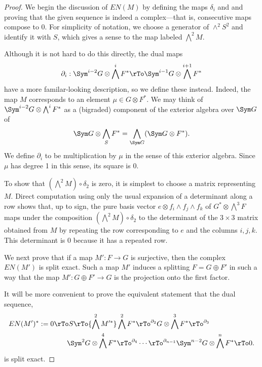 \begin{proof} We begin the discussion of $EN(M)$ by defining the maps $\delta_i$ and and proving that the given sequence is indeed a complex---that is, consecutive maps compose to 0. For simplicity of notation, we choose a generator of $\wedge^2 S^2$
 and identify it with $S$, which gives a sense to the map labeled $\bigwedge^2M$.
 
  Although it is not hard to do this directly, the dual maps
 $$
 \partial_i: \Sym^{i-2} G \otimes \bigwedge^i F^* \rTo \Sym^{i-1} G \otimes \bigwedge^{i+1} F^*
 $$
 have a more familar-looking description, so we define these instead. Indeed, the map $M$ corresponds to an
 element $\mu\in G\otimes F^*$. We may think of $ \Sym^{i-2} G \otimes \bigwedge^i  F^*$
 as a (bigraded) component of the exterior algebra over $ \Sym G$ of 
 $$
  \Sym G \otimes \bigwedge_S  F^*= \bigwedge_{ \Sym G} (\Sym G \otimes  F^*).
 $$
We define $\partial_i$ to be  multiplication by $\mu$ in the sense of this exterior algebra. Since $\mu$ has degree 1
in this sense, its square is 0. 

To show that $(\bigwedge^2 M)\circ \delta_2$ is zero, it is simplest to choose a matrix representing $M$.
Direct computation using only the usual expansion of a determinant
along a row shows that, up to sign, the
pure basis vector $e\otimes f_i\wedge f_j\wedge f_k$ of $G^*\otimes \bigwedge^3 F$
maps under the composition $(\bigwedge^2 M)\circ \delta_2$ to the determinant
of the $3\times 3$ matrix obtained from $M$ by repeating the row corresponding to $e$ and
the columns $i,j,k$. This determinant is 0 because it has a repeated row.

We next prove that if a map $M': F\to G$ is surjective, then the complex $EN(M')$
is split exact. Such a map $M'$ induces a splitting $F = G\oplus F'$ in such a way that the map $M': G\oplus F' \to G$ is the projection onto the first factor. 

It will be more convenient to prove the equivalent statement that 
the dual sequence,  
\begin{align*}
EN(M')^* := 
0\rTo S \rTo{\bigwedge^2 M'^*} 
 &\bigwedge^2 F^*
 \rTo^{\partial_{2}}
 G\otimes \bigwedge^3 F^*  
 \rTo^{\partial_{3}}\\
  \Sym^2G\otimes\bigwedge^4F^*  
 &\rTo^{\partial_{4}}\cdots\rTo^{\partial_{n-1}} 
\Sym^{n-2}G\otimes\bigwedge^nF^* 
 \rTo 0.
\end{align*}
is split exact.


\end{proof}
